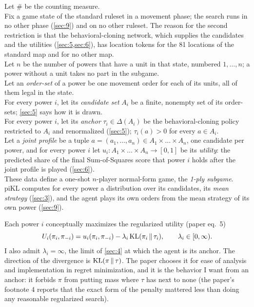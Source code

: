 \documentclass[12pt,a4paper]{article}
\begin{document}
Let $\#$ be the counting measure.\\
Fix a game state of the standard ruleset in a movement phase; the search runs in no other phase (\cref{sec:9}) and on no other ruleset.
The reason for the second restriction is that the behavioral-cloning network, which supplies the candidates and the utilities (\cref{sec:5,sec:6}), has location tokens for the 81 locations of the standard map and for no other map.\\
Let $n$ be the number of powers that have a unit in that state, numbered $1, \dots, n$; a power without a unit takes no part in the subgame.\\
Let an \emph{order-set} of a power be one movement order for each of its units, all of them legal in the state.\\
For every power $i$, let its \emph{candidate set} $A_i$ be a finite, nonempty set of its order-sets; \cref{sec:5} says how it is drawn.\\
For every power $i$, let its \emph{anchor} $\tau_i \in \Delta(A_i)$ be the behavioral-cloning policy restricted to $A_i$ and renormalized (\cref{sec:5}); $\tau_i(a) > 0$ for every $a \in A_i$.\\
Let a \emph{joint profile} be a tuple $a = (a_1, \dots, a_n) \in A_1 \times \dots \times A_n$, one candidate per power, and for every power $i$ let $u_i\colon A_1 \times \dots \times A_n \to [0, 1]$ be its \emph{utility}: the predicted share of the final Sum-of-Squares score that power $i$ holds after the joint profile is played (\cref{sec:6}).\\
These data define a one-shot $n$-player normal-form game, the \emph{1-ply subgame}.
piKL computes for every power a distribution over its candidates, its \emph{mean strategy} (\cref{sec:3}), and the agent plays its own orders from the mean strategy of its own power (\cref{sec:9}).

Each power $i$ conceptually maximizes the regularized utility (paper eq.~5)
\[
U_i(\pi_i, \pi_{-i}) = u_i(\pi_i, \pi_{-i}) - \lambda_i \operatorname{KL}(\pi_i \,\|\, \tau_i), \qquad \lambda_i \in [0, \infty).
\]
I also admit $\lambda_i = \infty$, the limit of \cref{sec:4} at which the agent is its anchor.
The direction of the divergence is $\operatorname{KL}(\pi \,\|\, \tau)$.
The paper chooses it for ease of analysis and implementation in regret minimization, and it is the behavior I want from an anchor: it forbids $\pi$ from putting mass where $\tau$ has next to none (the paper's footnote 4 reports that the exact form of the penalty mattered less than doing any reasonable regularized search).
\end{document}
